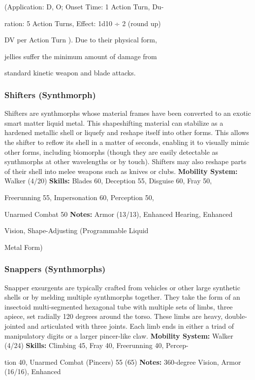 (Application: D, O; Onset Time: 1 Action Turn, Du-

ration: 5 Action Turns, Effect: 1d10 ÷ 2 (round up) 

DV per Action Turn ). Due to their physical form, 

jellies suffer the minimum amount of damage from 

standard kinetic weapon and blade attacks. 

\subsubsection{Shifters (Synthmorph)}

Shifters are synthmorphs whose material frames have 
been converted to an exotic smart matter liquid metal. 
This shapeshifting material can stabilize as a hardened 
metallic shell or liquefy and reshape itself into other 
forms. This allows the shifter to reflow its shell in a 
matter of seconds, enabling it to visually mimic other 
forms, including biomorphs (though they are easily 
detectable as synthmorphs at other wavelengths or by 
touch). Shifters may also reshape parts of their shell 
into melee weapons such as knives or clubs. 
\textbf{Mobility System: }Walker (4/20)
\textbf{Skills:} Blades 60, Deception 55, Disguise 60, Fray 50, 

Freerunning 55, Impersonation 60, Perception 50, 

Unarmed Combat 50 
\textbf{Notes: }Armor (13/13), Enhanced Hearing, Enhanced 

Vision, Shape-Adjusting (Programmable Liquid 

Metal Form)

\subsubsection{Snappers (Synthmorphs)}

Snapper exsurgents are typically crafted from vehicles 
or other large synthetic shells or by melding multiple 
synthmorphs together. They take the form of an insectoid
multi-segmented hexagonal tube with multiple
sets of limbs, three apiece, set radially 120 degrees 
around the torso. These limbs are heavy, double-jointed
and articulated with three joints. Each limb
ends in either a triad of manipulatory digits or a larger 
pincer-like claw.
\textbf{Mobility System:} Walker (4/24)
\textbf{Skills:} Climbing 45, Fray 40, Freerunning 40, Percep-

tion 40, Unarmed Combat (Pincers) 55 (65)
\textbf{Notes: }360-degree Vision, Armor (16/16), Enhanced 

